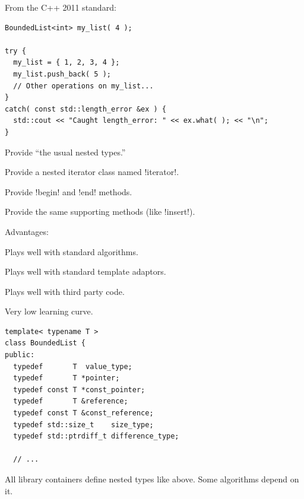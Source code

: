 \documentclass[landscape]{slides}
\begin{document}

From the C++ 2011 standard:
\begin{quote}
\end{quote}

\vspace{5.0mm}
{\small
\begin{lstlisting}
BoundedList<int> my_list( 4 );

try {
  my_list = { 1, 2, 3, 4 };
  my_list.push_back( 5 );
  // Other operations on my_list...
}
catch( const std::length_error &ex ) {
  std::cout << "Caught length_error: " << ex.what( ); << "\n";
}
\end{lstlisting}
}
\stopslide


\centerline{}

\begin{citemize}
\item Provide ``the usual nested types.''
\item Provide a nested iterator class named !iterator!.
\item Provide !begin! and !end! methods.
\item Provide the same supporting methods (like !insert!).
\end{citemize}
Advantages:
\begin{citemize}
\item Plays well with standard algorithms.
\item Plays well with standard template adaptors.
\item Plays well with third party code.
\item Very low learning curve.
\end{citemize}
\stopslide


{\small
\begin{lstlisting}
template< typename T >
class BoundedList {
public:
  typedef       T  value_type;
  typedef       T *pointer;
  typedef const T *const_pointer;
  typedef       T &reference;
  typedef const T &const_reference;
  typedef std::size_t    size_type;
  typedef std::ptrdiff_t difference_type;

  // ...
\end{lstlisting}
}
All library containers define nested types like above. Some algorithms depend on it. 
\stopslide
\end{document}
